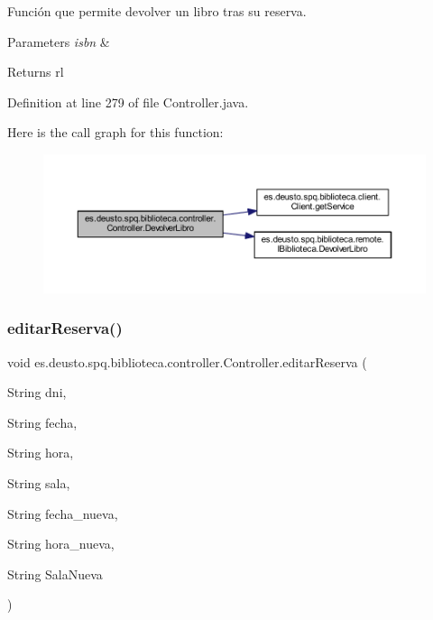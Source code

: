 Función que permite devolver un libro tras su reserva. 
\begin{DoxyParams}{Parameters}
{\em isbn} & \\
\hline
\end{DoxyParams}
\begin{DoxyReturn}{Returns}
rl 
\end{DoxyReturn}


Definition at line 279 of file Controller.\+java.

Here is the call graph for this function\+:
\nopagebreak
\begin{figure}[H]
\begin{center}
\leavevmode
\includegraphics[width=350pt]{classes_1_1deusto_1_1spq_1_1biblioteca_1_1controller_1_1_controller_abe34befc3a9ab68e3686c9251b2c912e_cgraph}
\end{center}
\end{figure}
\mbox{\label{classes_1_1deusto_1_1spq_1_1biblioteca_1_1controller_1_1_controller_a484413ba14d131c9840c5cd7bd4d8494}} 
\subsubsection{\texorpdfstring{editar\+Reserva()}{editarReserva()}}
{\footnotesize\ttfamily void es.\+deusto.\+spq.\+biblioteca.\+controller.\+Controller.\+editar\+Reserva (\begin{DoxyParamCaption}\item[{String}]{dni,  }\item[{String}]{fecha,  }\item[{String}]{hora,  }\item[{String}]{sala,  }\item[{String}]{fecha\+\_\+nueva,  }\item[{String}]{hora\+\_\+nueva,  }\item[{String}]{Sala\+Nueva }\end{DoxyParamCaption})}

